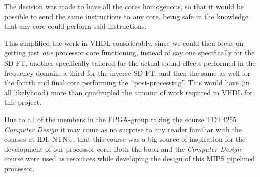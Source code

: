 The decision was made to have all the cores homogenous, so that it would be
possible to send the same instructions to any core, being safe in the knowledge
that any core could perform said instructions.

This simplified the work in VHDL considerably, since we could then focus on
getting just \emph{one} processor core functioning, instead of say one
specifically for the SD-FT, another specifically tailored for the actual
sound-effects performed in the frequency domain, a third for the inverse-SD-FT,
and then the same as well for the fourth and final core performing the
``post-processing''. This would have (in all likelyhood) more than quadrupled
the amount of work required in VHDL for this project.

Due to all of the members in the FPGA-group taking the course TDT4255 \emph{
Computer Design} it may come as no surprise to any reader familiar with the
courses at IDI, NTNU, that this course was a big source of inspiration for the
development of our processor-core. Both the book\cite{tdt4255-book} and the
\emph{Computer Design} course were used as resources while developing the design
of this MIPS pipelined processor.
